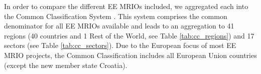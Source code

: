 In order to compare the different EE MRIOs included, we aggregated each into the Common Classification System \cite{Steen_Olsen_2014}. 
This system comprises the common denominator for all EE MRIOs available and leads to an aggregation to 41 regions (40 countries and 1 Rest of the World, see Table \ref{tab:cc_regions}) and 17 sectors (see Table \ref{tab:cc_sectors}). 
Due to the European focus of most EE MRIO projects, the Common Classification includes all European Union countries (except the new member state Croatia).



